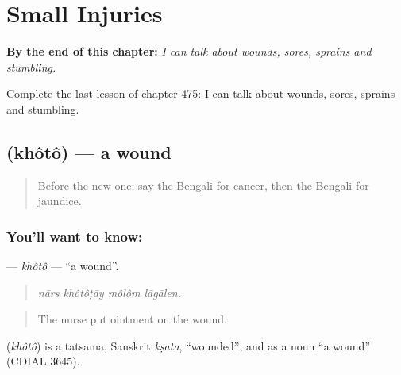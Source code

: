 
\chapter{Small Injuries}
\label{ch:bn-small-injuries}

\begin{chapteropening}
\textbf{By the end of this chapter:} \emph{I can talk about wounds, sores, sprains and stumbling.}

Complete the last lesson of chapter 475: I can talk about wounds, sores, sprains and stumbling.
\end{chapteropening}

\section[\texorpdfstring{\bn{ক্ষত} (khôtô)}{ক্ষত (khôtô)}]{ (khôtô) — a wound}

\label{lesson:BN-C475-khoto}



\begin{quote}
Before the new one: say the Bengali for cancer, then the Bengali for jaundice.
\end{quote}

\subsection*{You'll want to know: }
\textbf{} — \emph{khôtô} — \textquotedblleft{}a wound\textquotedblright{}.

\begin{quote}
   
\end{quote}

\begin{quote}
\emph{nārs khôtôṭāy môlôm lāgālen.}
\end{quote}

\begin{quote}
The nurse put ointment on the wound.
\end{quote}

\begin{cousinweb}
\textbf{} (\emph{khôtô}) is a tatsama, Sanskrit \emph{kṣata}, \textquotedblleft{}wounded\textquotedblright{}, and as a noun \textquotedblleft{}a wound\textquotedblright{} (CDIAL 3645).
\end{cousinweb}

